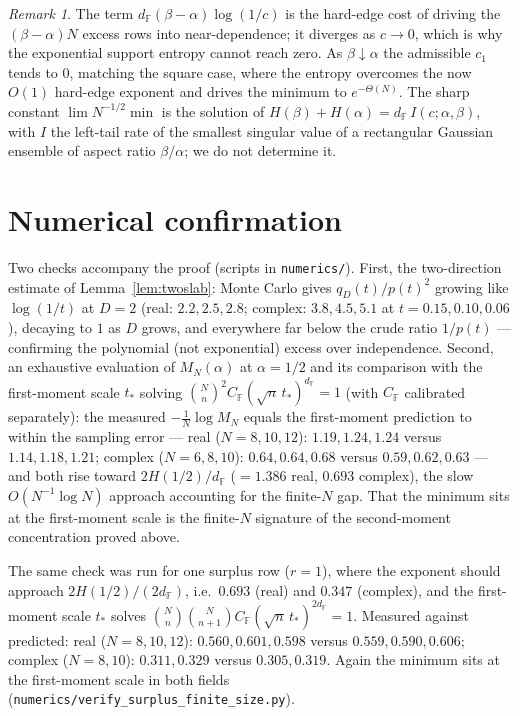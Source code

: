 \documentclass[11pt,reqno]{amsart}
\theoremstyle{plain}
\theoremstyle{definition}
\theoremstyle{remark}
\newtheorem{remark}[theorem]{Remark}
\newcommand{\F}{\mathbb{F}}
\newcommand{\dF}{d_{\F}}
\begin{document}
\begin{remark}
The term $\dF(\beta-\alpha)\log(1/c)$ is the hard-edge cost of driving the $(\beta-\alpha)N$ excess
rows into near-dependence; it diverges as $c\to0$, which is why the exponential support entropy
cannot reach zero. As $\beta\downarrow\alpha$ the admissible $c_1$ tends to $0$, matching the square
case, where the entropy overcomes the now $O(1)$ hard-edge exponent and drives the minimum to
$e^{-\Theta(N)}$. The sharp constant $\lim N^{-1/2}\min$ is the solution of
$H(\beta)+H(\alpha)=\dF\,I(c;\alpha,\beta)$, with $I$ the left-tail rate of the smallest singular
value of a rectangular Gaussian ensemble of aspect ratio $\beta/\alpha$; we do not determine it.
\end{remark}

\section{Numerical confirmation}\label{sec:num}
Two checks accompany the proof (scripts in \texttt{numerics/}). First, the two-direction estimate
of Lemma~\ref{lem:twoslab}: Monte Carlo gives $q_D(t)/p(t)^2$ growing like $\log(1/t)$ at $D=2$
(real: $2.2,2.5,2.8$; complex: $3.8,4.5,5.1$ at $t=0.15,0.10,0.06$), decaying to $1$ as $D$ grows,
and everywhere far below the crude ratio $1/p(t)$ — confirming the polynomial (not exponential)
excess over independence. Second, an exhaustive evaluation of $M_N(\alpha)$ at $\alpha=1/2$ and its
comparison with the first-moment scale $t_\ast$ solving $\binom Nn^2 C_\F(\sqrt n\,t_\ast)^{\dF}=1$
(with $C_\F$ calibrated separately): the measured $-\tfrac1N\log M_N$ equals the first-moment
prediction to within the sampling error — real ($N=8,10,12$): $1.19,1.24,1.24$ versus $1.14,1.18,1.21$;
complex ($N=6,8,10$): $0.64,0.64,0.68$ versus $0.59,0.62,0.63$ — and both rise toward $2H(1/2)/\dF$
($=1.386$ real, $0.693$ complex), the slow $O(N^{-1}\log N)$ approach accounting for the finite-$N$
gap. That the minimum sits at the first-moment scale is the finite-$N$ signature of the second-moment
concentration proved above.

The same check was run for one surplus row ($r=1$), where the exponent should approach
$2H(1/2)/(2\dF)$, i.e.\ $0.693$ (real) and $0.347$ (complex), and the first-moment scale $t_\ast$
solves $\binom Nn\binom N{n+1}C_\F(\sqrt n\,t_\ast)^{2\dF}=1$. Measured against predicted: real
($N=8,10,12$): $0.560,0.601,0.598$ versus $0.559,0.590,0.606$; complex ($N=8,10$): $0.311,0.329$
versus $0.305,0.319$. Again the minimum sits at the first-moment scale in both fields
(\texttt{numerics/verify\_surplus\_finite\_size.py}).
\end{document}
